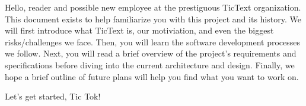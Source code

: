 Hello, reader and possible new employee at the prestiguous TicText organization. This document exists to help familiarize you with this project and its history. We will first introduce what TicText is, our motiviation, and even the biggest risks/challenges we face. Then, you will learn the software development processes we follow. Next, you will read a brief overview of the project's requirements and specifications before diving into the current architecture and design. Finally, we hope a brief outline of future plans will help you find what you want to work on.

\begin{flushright}
Let's get started, Tic Tok!
\end{flushright}